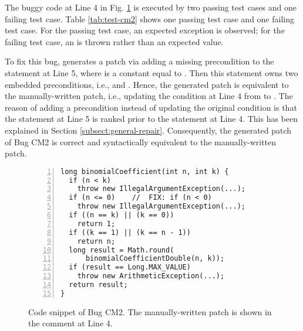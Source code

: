 The buggy code at Line 4 in Fig. \ref{fig:bug-cm2} is executed by two passing test cases and one failing test case. Table \ref{tab:test-cm2} shows one passing test case and one failing test case. For the passing test case, an expected exception is observed; for the failing test case, an  is thrown rather than an expected value. 

To fix this bug, \nopol generates a patch via adding a missing precondition  to the statement at Line 5, where  is a constant equal to . 
Then this statement owns two embedded preconditions, i.e.,  and . 
Hence, the generated patch is equivalent to the manually-written patch, i.e., updating the condition at Line 4 from  to . 
The reason of adding a precondition instead of updating the original condition is that the statement at Line 5 is ranked prior to the statement at Line 4. This has been explained in Section \ref{subsect:general-repair}.  
Consequently, the generated patch of Bug CM2 is correct and syntactically equivalent to the manually-written patch.

\begin{figure}[!t]
\centering
\noindent\begin{minipage}{0.4\textwidth}
\begin{lstlisting}[numbers=left]
long binomialCoefficient(int n, int k) {
  if (n < k) 
    throw new IllegalArgumentException(...);
  if (n <= 0)    //  FIX: if (n < 0)  
    throw new IllegalArgumentException(...);
  if ((n == k) || (k == 0)) 
    return 1;
  if ((k == 1) || (k == n - 1)) 
    return n;
  long result = Math.round(
      binomialCoefficientDouble(n, k));
  if (result == Long.MAX_VALUE) 
    throw new ArithmeticException(...);
  return result;
}
\end{lstlisting}

\end{minipage}
\caption{Code snippet of Bug CM2. The manually-written patch is shown in the  comment at Line 4.}
\label{fig:bug-cm2}
\end{figure}

\begin{table}[!t]
\centering
\caption{Sample of test cases for Bug CM2}
\label{tab:test-cm2}

\end{table}

